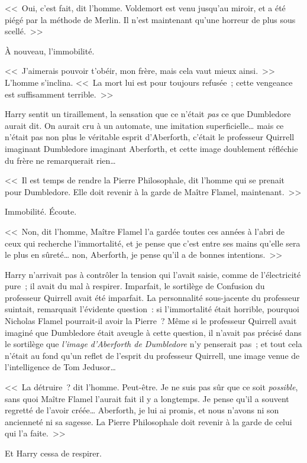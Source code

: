 <<~Oui, c'est fait, dit l'homme. Voldemort est venu jusqu'au miroir, et a été piégé par la méthode de Merlin. Il n'est maintenant qu'une horreur de plus sous scellé.~>>

À nouveau, l'immobilité.

<<~J'aimerais pouvoir t'obéir, mon frère, mais cela vaut mieux ainsi.~>> L'homme s'inclina. <<~La mort lui est pour toujours refusée~; cette vengeance est suffisamment terrible.~>>

Harry sentit un tiraillement, la sensation que ce n'était \emph{pas} ce que Dumbledore aurait dit. On aurait cru à un automate, une imitation superficielle… mais ce n'était pas non plus le véritable esprit d'Aberforth, c'était le professeur Quirrell imaginant Dumbledore imaginant Aberforth, et cette image doublement réfléchie du frère ne remarquerait rien…

<<~Il est temps de rendre la Pierre Philosophale, dit l'homme qui se prenait pour Dumbledore. Elle doit revenir à la garde de Maître Flamel, maintenant.~>>

Immobilité. Écoute.

<<~Non, dit l'homme, Maître Flamel l'a gardée toutes ces années à l'abri de ceux qui recherche l'immortalité, et je pense que c'est entre ses mains qu'elle sera le plus en sûreté… non, Aberforth, je pense qu'il a de bonnes intentions.~>>

Harry n'arrivait pas à contrôler la tension qui l'avait saisie, comme de l'électricité pure~; il avait du mal à respirer. Imparfait, le sortilège de Confusion du professeur Quirrell avait été imparfait. La personnalité sous-jacente du professeur suintait, remarquait l'évidente question~: si l'immortalité était horrible, pourquoi Nicholas Flamel pourrait-il avoir la Pierre~? Même si le professeur Quirrell avait imaginé que Dumbledore était aveugle à cette question, il n'avait pas précisé dans le sortilège que \emph{l'image d'Aberforth de Dumbledore} n'y penserait pas~; et tout cela n'était au fond qu'un reflet de l'esprit du professeur Quirrell, une image venue de l'intelligence de Tom Jedusor…

<<~La détruire~? dit l'homme. Peut-être. Je ne suis pas sûr que ce soit \emph{possible}, sans quoi Maître Flamel l'aurait fait il y a longtemps. Je pense qu'il a souvent regretté de l'avoir créée… Aberforth, je lui ai promis, et nous n'avons ni son ancienneté ni sa sagesse. La Pierre Philosophale doit revenir à la garde de celui qui l'a faite.~>>

Et Harry cessa de respirer.

